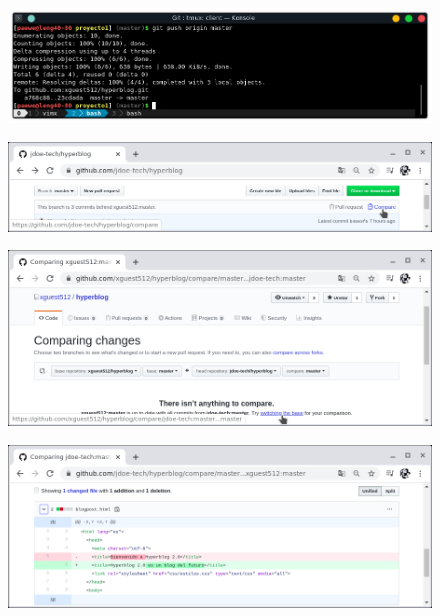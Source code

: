 \documentclass{article}
\begin{document}
\begin{figure}[h!]
  \centering
  \includegraphics[scale=0.75]{./Pictures/242_push.png}
\end{figure}

\begin{figure}[h!]
  \centering
  \includegraphics[scale=0.75]{./Pictures/243_jdoe_github.png}
\end{figure}

\begin{figure}[h!]
  \centering
  \includegraphics[scale=0.75]{./Pictures/244_swith_base.png}
\end{figure}

\begin{figure}[h!]
  \centering
  \includegraphics[scale=0.75]{./Pictures/245_compare.png}
\end{figure}
\end{document}
